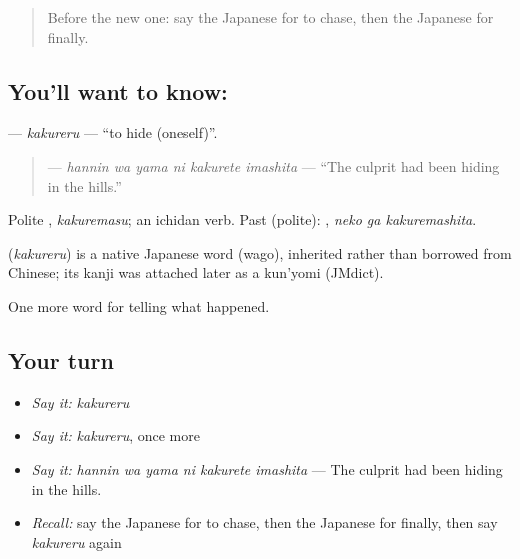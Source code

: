 \label{lesson:JA-C271-kakureru}



\begin{quote}
Before the new one: say the Japanese for to chase, then the Japanese for finally.
\end{quote}

\subsection*{You'll want to know: }
\textbf{} — \emph{kakureru} — \textquotedblleft{}to hide (oneself)\textquotedblright{}.

\begin{quote}
\textbf{  } — \emph{hannin wa yama ni kakurete imashita} — \textquotedblleft{}The culprit had been hiding in the hills.\textquotedblright{}
\end{quote}

Polite \textbf{}, \emph{kakuremasu}; an ichidan verb. Past (polite): \textbf{ }, \emph{neko ga kakuremashita}.

\begin{cousinweb}
\textbf{} (\emph{kakureru}) is a native Japanese word (wago), inherited rather than borrowed from Chinese; its kanji was attached later as a kun'yomi (JMdict).
\end{cousinweb}

\begin{grammarlens}[title={What you've built}]
One more word for telling what happened.
\end{grammarlens}

\subsection*{Your turn}
\begin{itemize}
\raggedright
  \item \emph{Say it:} \emph{kakureru}
  \item \emph{Say it:} \emph{kakureru}, once more
  \item \emph{Say it:} \emph{hannin wa yama ni kakurete imashita} — The culprit had been hiding in the hills.
  \item \emph{Recall:} say the Japanese for to chase, then the Japanese for finally, then say \emph{kakureru} again
\end{itemize}


